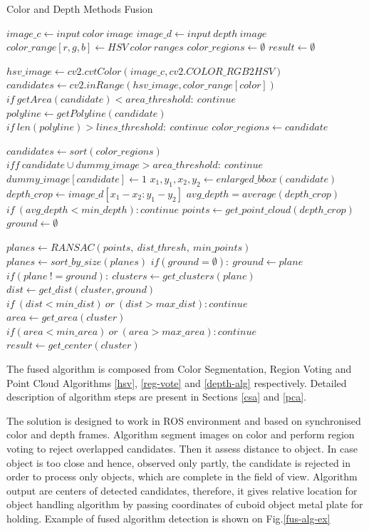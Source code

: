 \documentclass{ctuthesis}
\begin{document}
\begin{algorithm}
\caption{Color and Depth Methods Fusion}\label{sens-f}
\begin{algorithmic}[1]

\State $image\_c \gets input\ color\ image$
\State $image\_d \gets input\ depth\ image$
\State $color\_range[r,g,b] \gets HSV\ color\ ranges$
\State $color\_regions \gets \emptyset$
\State $result \gets \emptyset$

\State $hsv\_image \gets cv2.cvtColor(image\_c, cv2.COLOR\_RGB2HSV)$
\State $candidates \gets cv2.inRange(hsv\_image, color\_range[color])$
\State $if\ getArea(candidate) < area\_threshold:\ continue$
\State $polyline \gets getPolyline(candidate)$
\State $if\ len(polyline) > lines\_threshold:\ continue$
\State $color\_regions \gets candidate$
\EndFor
\EndFor


\State $candidates \gets sort(color\_regions)$
\State $iff\ candidate \cup dummy\_image > area\_threshold:\ continue$
\State $dummy\_image[candidate] \gets 1$
\State $x_1, y_1, x_2, y_2 \gets enlarged\_bbox(candidate)$
\State $depth\_crop \gets image\_d[x_1 - x_2 : y_1 - y_2]$
\State $avg\_depth = average(depth\_crop)$
\State $if\ (avg\_depth < min\_depth): continue$
\State $points \gets get\_point\_cloud(depth\_crop)$
\State $ground \gets \emptyset$


\State $planes \gets RANSAC(points,\ dist\_thresh,\ min\_points)$
\State $planes \gets sort\_by\_size(planes)$
\State $if (ground = \emptyset):\ ground \gets plane$
\State $if (plane\ != ground):\ clusters \gets get\_clusters(plane)$
\State $dist \gets get\_dist(cluster, ground)$
\State $if\ (dist < min\_dist)\ or\ (dist > max\_dist): continue$
\State $area \gets get\_area(cluster)$
\State $if (area < min\_area)\ or\ (area > max\_area): continue$
\State $result \gets get\_center(cluster)$
\EndFor
\EndFor
\EndFor

\end{algorithmic}
\end{algorithm}

The fused algorithm is composed from Color Segmentation, Region Voting and Point Cloud Algorithms \ref{hsv}, \ref{reg-vote} and \ref{depth-alg} respectively. Detailed description of algorithm steps are present in Sections \ref{csa} and \ref{pca}.

The solution is designed to work in ROS environment and based on synchronised color and depth frames. Algorithm segment images on color and perform region voting to reject overlapped candidates. Then it assess distance to object. In case object is too close and hence, observed only partly, the candidate is rejected in order to process only objects, which are complete in the field of view. Algorithm output are centers of detected candidates, therefore, it gives relative location for object handling algorithm by passing coordinates of cuboid object metal plate for holding. Example of fused algorithm detection is shown on Fig.\ref{fus-alg-ex}
\end{document}
